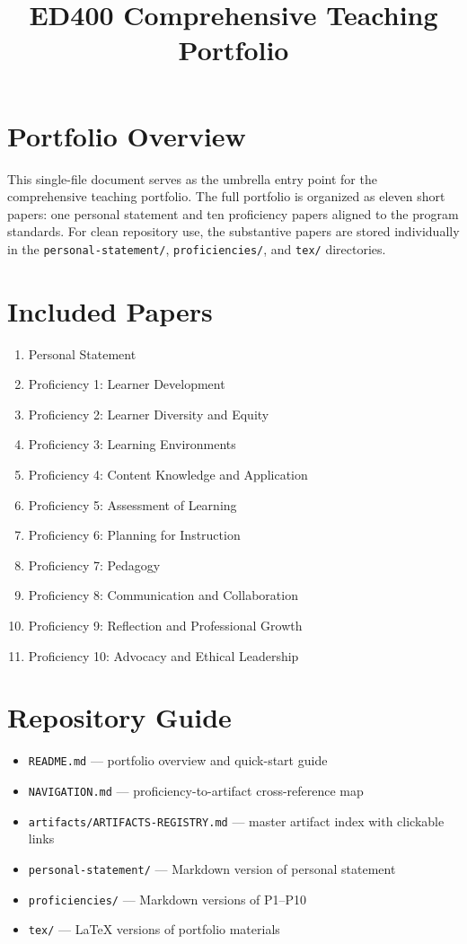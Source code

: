 \documentclass[12pt]{article}
\title{ED400 Comprehensive Teaching Portfolio}
\author{\PortfolioAuthor}
\date{\PortfolioDate}
\begin{document}
\maketitle

\section*{Portfolio Overview}
This single-file document serves as the umbrella entry point for the comprehensive teaching portfolio. The full portfolio is organized as eleven short papers: one personal statement and ten proficiency papers aligned to the program standards. For clean repository use, the substantive papers are stored individually in the \texttt{personal-statement/}, \texttt{proficiencies/}, and \texttt{tex/} directories.

\section*{Included Papers}
\begin{enumerate}[leftmargin=1.5em]
    \item Personal Statement
    \item Proficiency 1: Learner Development
    \item Proficiency 2: Learner Diversity and Equity
    \item Proficiency 3: Learning Environments
    \item Proficiency 4: Content Knowledge and Application
    \item Proficiency 5: Assessment of Learning
    \item Proficiency 6: Planning for Instruction
    \item Proficiency 7: Pedagogy
    \item Proficiency 8: Communication and Collaboration
    \item Proficiency 9: Reflection and Professional Growth
    \item Proficiency 10: Advocacy and Ethical Leadership
\end{enumerate}

\section*{Repository Guide}
\begin{itemize}[leftmargin=1.5em]
    \item \texttt{README.md} --- portfolio overview and quick-start guide
    \item \texttt{NAVIGATION.md} --- proficiency-to-artifact cross-reference map
    \item \texttt{artifacts/ARTIFACTS-REGISTRY.md} --- master artifact index with clickable links
    \item \texttt{personal-statement/} --- Markdown version of personal statement
    \item \texttt{proficiencies/} --- Markdown versions of P1--P10
    \item \texttt{tex/} --- LaTeX versions of portfolio materials
\end{itemize}
\end{document}
